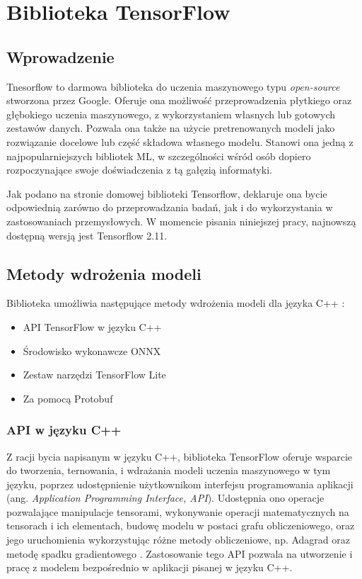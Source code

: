\chapter{Biblioteka TensorFlow}

\section{Wprowadzenie}

Tnesorflow to darmowa biblioteka do uczenia maszynowego typu \textit{open-source} stworzona przez Google. Oferuje ona możliwość przeprowadzenia płytkiego oraz głębokiego uczenia maszynowego, z wykorzystaniem własnych lub gotowych zestawów danych. Pozwala ona także na użycie pretrenowanych modeli jako rozwiązanie docelowe lub część składowa własnego modelu. Stanowi ona jedną z najpopularniejszych bibliotek ML, w szczególności wśród osób dopiero rozpoczynające swoje doświadczenia z tą gałęzią informatyki.

Jak podano na stronie domowej biblioteki Tensorflow\cite{tf}, deklaruje ona bycie odpowiednią zarówno do przeprowadzania badań, jak i do wykorzystania w zastosowaniach przemysłowych. W momencie pisania niniejszej pracy, najnowszą dostępną wersją jest Tensorflow 2.11.

\section{Metody wdrożenia modeli}

Biblioteka umożliwia następujące metody wdrożenia modeli dla języka C++ \cite{protobuf}\cite{deploy3}\cite{tflite}:

\begin{itemize}
	\item API TensorFlow w języku C++
	\item Środowisko wykonawcze ONNX
	\item Zestaw narzędzi TensorFlow Lite
	\item Za pomocą Protobuf
\end{itemize}

\subsection{API w języku C++}

Z racji bycia napisanym w języku C++, biblioteka TensorFlow oferuje wsparcie do tworzenia, ternowania, i wdrażania modeli uczenia maszynowego w tym języku, poprzez udostępnienie użytkownikom interfejsu programowania aplikacji (ang. \textit{Application Programming Interface, API}). Udostępnia ono operacje pozwalające manipulacje tensorami, wykonywanie operacji matematycznych na tensorach i ich elementach, budowę modelu w postaci grafu obliczeniowego, oraz jego uruchomienia wykorzystując różne metody obliczeniowe, np. Adagrad oraz metodę spadku gradientowego \cite{tfcpp}. Zastosowanie tego API pozwala na utworzenie i pracę z modelem bezpośrednio w aplikacji pisanej w języku C++.

